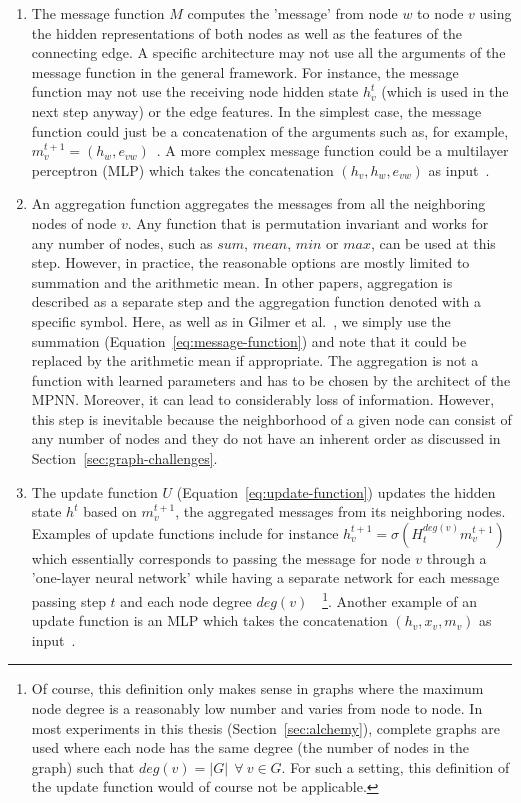 \begin{enumerate}
	\item The message function $M$ computes the 'message' from node $w$ to node $v$ using the hidden representations of both nodes as well as the features of the connecting edge. A specific architecture may not use all the arguments of the message function in the general framework. For instance, the message function may not use the receiving node hidden state $h_v^t$ (which is used in the next step anyway) or the edge features. In the simplest case, the message function could just be a concatenation of the arguments such as, for example, $m_v^{t+1} = (h_w, e_{vw})$~\cite{Duvenaud2015}. A more complex message function could be a multilayer perceptron (MLP) which takes the concatenation $(h_v, h_w, e_{vw})$ as input~\cite{Battaglia2016}.
	
	\item An aggregation function aggregates the messages from all the neighboring nodes of node $v$. Any function that is permutation invariant and works for any number of nodes, such as $sum$, $mean$, $min$ or $max$, can be used at this step. However, in practice, the reasonable options are mostly limited to summation and the arithmetic mean.	
	In other papers, aggregation is described as a separate step and the aggregation function denoted with a specific symbol. Here, as well as in Gilmer et al.~\cite{Gilmer2017}, we simply use the summation (Equation~\ref{eq:message-function}) and note that it could be replaced by the arithmetic mean if appropriate.
	The aggregation is not a function with learned parameters and has to be chosen by the architect of the MPNN. Moreover, it can lead to considerably loss of information. However, this step is inevitable because the neighborhood of a given node can consist of any number of nodes and they do not have an inherent order as discussed in Section~\ref{sec:graph-challenges}.
	
	\item The update function $U$ (Equation~\ref{eq:update-function}) updates the hidden state $h^t$ based on  $m_v^{t+1}$, the aggregated messages from its neighboring nodes. Examples of update functions include for instance $h_v^{t+1} = \sigma(H_t^{deg(v)} m_v^{t+1})$ which essentially corresponds to passing the message for node $v$ through a 'one-layer neural network' while having a separate network for each message passing step $t$ and each node degree $deg(v)$~\cite{Duvenaud2015}~\footnote{
		Of course, this definition only makes sense in graphs where the maximum node degree is a reasonably low number  and varies from node to node. In most experiments in this thesis (Section~\ref{sec:alchemy}), complete graphs are used where each node has the same degree (the number of nodes in the graph) such that $deg(v) =|G|~~ \forall~ v \in G$. For such a setting, this definition of the update function would of course not be applicable.
	}. Another example of an update function is an MLP which takes the concatenation $(h_v, x_v, m_v)$ as input~\cite{Battaglia2016}.
\end{enumerate}

